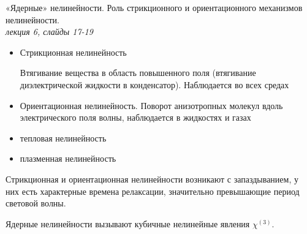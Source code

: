 
\begin{leftrules}
«Ядерные» нелинейности. Роль стрикционного и ориентационного механизмов нелинейности.
\\ \phantom{42} \hfill \textit{лекция 6, слайды 17-19} 
\end{leftrules}

\begin{itemize}
    \item Стрикционная нелинейность

    Втягивание вещества в область повышенного поля (втягивание диэлектрической жидкости в конденсатор). Наблюдается во всех средах

    \item Ориентационная нелинейность. Поворот анизотропных молекул вдоль электрического поля волны, наблюдается в жидкостях и газах

    \item тепловая нелинейность

    \item плазменная нелинейность

\end{itemize}

Стрикционная и ориентационная нелинейности возникают с запаздыванием, у них есть характерные времена релаксации, значительно превышающие период световой волны.

Ядерные нелинейности вызывают кубичные нелинейные явления $\chi^{(3)}$.